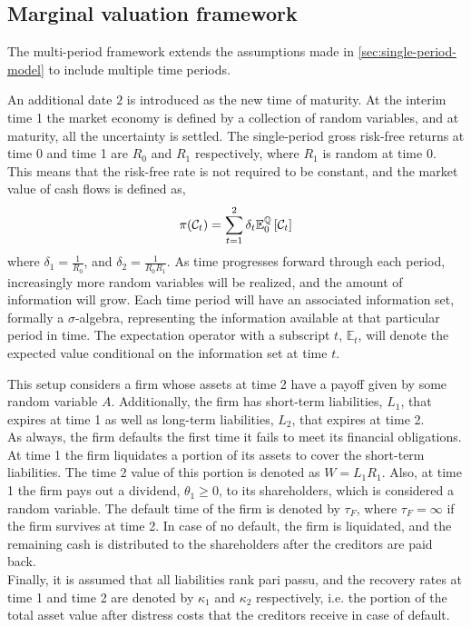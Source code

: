 \documentclass[main.tex]{subfiles}
\begin{document}
    \subsection{Marginal valuation framework}
        The multi-period framework extends the assumptions made in \cref{sec:single-period-model} to include multiple time periods.

        An additional date $2$ is introduced as the new time of maturity.
        At the interim time 1 the market economy is defined by a collection of random variables,
        and at maturity, all the uncertainty is settled. 
        The single-period gross risk-free returns at time 0 and time 1 are $R_0$ and $R_1$ respectively, where $R_1$ is random at time 0.
        This means that the risk-free rate is not required to be constant,
        and the market value of cash flows is defined as,
        \begin{equation}
            \pi(\mathcal{C}_{t}) =
            \sum_{t=1}^{2}
            \delta_t \mathbb{E}_{0}^{\mathbb{Q}}\left[\mathcal{C}_{t}\right]
        \end{equation}
        where $\delta_1 = \frac{1}{R_0}$,
        and $\delta_2 = \frac{1}{R_{0}R_{1}}$.
        As time progresses forward through each period, 
        increasingly more random variables will be realized,
        and the amount of information will grow.
        Each time period will have an associated information set, formally a $\sigma$-algebra,
        representing the information available at that particular period in time.
        The expectation operator with a subscript $t$, $\mathbb{E}_{t}$, 
        will denote the expected value conditional on the information set at time $t$.

        This setup considers a firm whose assets at time 2 have a payoff given by some random variable $A$.
        Additionally, the firm has short-term liabilities, $L_1$, that expires at time 1 as well as long-term liabilities, $L_2$, that expires at time 2.
        \\
        As always, the firm defaults the first time it fails to meet its financial obligations.
        At time 1 the firm liquidates a portion of its assets to cover the short-term liabilities.
        The time 2 value of this portion is denoted as $W = L_1 R_1$.
        Also, at time 1 the firm pays out a dividend, $\theta_1 \geq 0$, to its shareholders,
        which is considered a random variable.
        The default time of the firm is denoted by $\tau_{F}$,
        where $\tau_{F} = \infty$ if the firm survives at time 2.
        In case of no default, the firm is liquidated, and the remaining cash is distributed to the shareholders after the creditors are paid back.
        \\
        Finally, it is assumed that all liabilities rank pari passu,
        and the recovery rates at time 1 and time 2 are denoted by $\kappa_1$ and $\kappa_2$ respectively,
        i.e. the portion of the total asset value after distress costs that the creditors receive in case of default.
\end{document}
